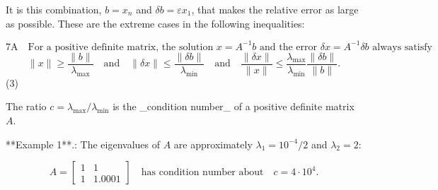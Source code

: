 It is this combination, \(b=x_{n}\) and \(\delta b=\varepsilon x_{1}\), that makes the relative error as large as possible. These are the extreme cases in the following inequalities:

\[\text{7A}\quad\text{For a positive definite matrix, the solution $x=A^{-1}b$ and the error $\delta x=A^{-1}\delta b$ always satisfy}\] \[\|x\|\geq\frac{\|b\|}{\lambda_{\max}}\quad\text{and}\quad\| \delta x\|\leq\frac{\|\delta b\|}{\lambda_{\min}}\quad\text{and}\quad\frac{ \|\delta x\|}{\|x\|}\leq\frac{\lambda_{\max}}{\lambda_{\min}}\frac{\|\delta b \|}{\|b\|}.\] (3)

The ratio \(c=\lambda_{\max}/\lambda_{\min}\) is the _condition number_ of a positive definite matrix \(A\).

**Example 1**.: The eigenvalues of \(A\) are approximately \(\lambda_{1}=10^{-4}/2\) and \(\lambda_{2}=2\):

\[A=\begin{bmatrix}1&1\\ 1&1.0001\end{bmatrix}\quad\text{has condition number about}\quad c=4\cdot 10^{4}.\] 